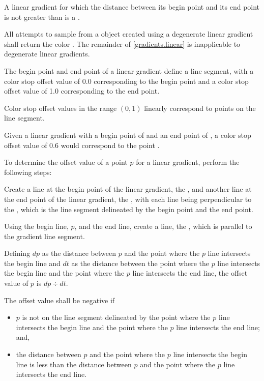 \pnum
A linear gradient for which the distance between its begin point and its end point is not greater than  is a .

\pnum
All attempts to sample from a  object created using a degenerate linear gradient shall return the color . The remainder of \ref{gradients.linear} is inapplicable to degenerate linear gradients.

\pnum
The begin point and end point of a linear gradient define a line segment, with a color stop offset value of 0.0 corresponding to the begin point and a color stop offset value of 1.0 corresponding to the end point.

\pnum
Color stop offset values in the range $(0,1)$ linearly correspond to points on the line segment.

\pnum
\enterexample
Given a linear gradient with a begin point of  and an end point of , a color stop offset value of 0.6 would correspond to the point .
\exitexample

\pnum
To determine the offset value of a point $p$ for a linear gradient, perform the following steps:
\begin{enumeratea}
\item Create a line at the begin point of the linear gradient, the , and another line at the end point of the linear gradient, the , with each line being perpendicular to the , which is the line segment delineated by the begin point and the end point.

\item Using the begin line, $p$, and the end line, create a line, the , which is parallel to the gradient line segment.

\item Defining $dp$ as the distance between $p$ and the point where the $p$ line intersects the begin line and $dt$ as the distance between the point where the $p$ line intersects the begin line and the point where the $p$ line intersects the end line, the offset value of $p$ is $dp \div dt$.

\item The offset value shall be negative if
\begin{itemize}
\item $p$ is not on the line segment delineated by the point where the $p$ line intersects the begin line and the point where the $p$ line intersects the end line; and,

\item the distance between $p$ and the point where the $p$ line intersects the begin line is less than the distance between $p$ and the point where the $p$ line intersects the end line.
\end{itemize}
\end{enumeratea}

